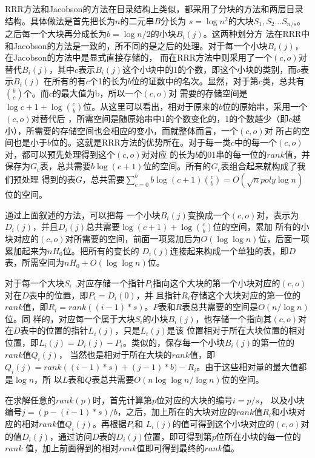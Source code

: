 RRR方法和Jacobson的方法在目录结构上类似，都采用了分块的方法和两层目录结构。具体做法是首先把长为$n$的二元串$B$分长为
$s = \log n^2$的大块$S_1, S_2\ldots S_{n/s}$。之后每一个大块再分成长为$b = \log {n/2}$的小块$B_i(j)$。这两种划分方
法在RRR中和Jacobson的方法是一致的，所不同的是之后的处理。对于每一个小块$B_i(j)$，在Jacobson的方法中是显式直接存储的，
而在RRR方法中则采用了一个$(c, o)$对替代$B_i(j)$，其中$c$表示$B_i(j)$这个小块中的1的个数，即这个小块的类别，而$o$表示$B_i(j)$
在所有的有$c$个1的长为$b$位的证数中的名次。显然，对于第$c$类，总共有$\binom{b}{c}$个。而$c$的最大值为b，所以一个$(c, o)$对
需要的存储空间是$\log{c + 1} + \log{\binom{c}{b}}$位。从这里可以看出，相对于原来的$b$位的原始串，采用一个$(c, o)$对替代后
，所需空间是随原始串中1的个数变化的，1的个数越少（即$c$越小），所需要的存储空间也会相应的变小，而就整体而言，一个$(c, o)$对
所占的空间也是小于$b$位的。这就是RRR方法的优势所在。对于每一类$c$中的每一个$(c, o)$对，都可以预先处理得到这个$(c, o)$对对应
的长为$b$的01串的每一位的$rank$值，并保存为$G_c$表，总共需要$b\log(c + 1)$位的空间。所有的$G_c$表组合起来就构成了我们预处理
得到的表$G$，总共需要$\sum_{c=0}^b {b\log (c+1)\binom{c}{b}=O(\sqrt{n}poly \log n)}$位的空间。

通过上面叙述的方法，可以把每
一个小块$B_i(j)$变换成一个$(c, o)$对，表示为$D_i(j)$，并且$D_i(j)$总共需要$\log(c + 1) + \log\binom{c}{b}$位的空间，累加
所有的小块对应的$(c, o)$对所需要的空间，前面一项累加后为$O(\log\log n)$位，后面一项累加起来为$nH_0$位。把所有的变长的
$D_i(j)$连接起来构成一个单独的表，即$D$表，所需空间为$nH_0 + O(\log\log n)$位。

对于每一个大块$S_i$ ,对应存储一个指针$P_i$指向这个大块的第一个小块对应的$(c, o)$对在$D$表中的位置，即$P_i = D_i(0)$，并
且指针$R_i$存储这个大块对应的第一位的$rank$值，即$R_i = rank((i-1)*s)$。$P$表和$R$表总共需要的空间是$O(n/\log n)$位。同
样的，对应每一个属于大块$S_i$的小块$B_i(j)$，也存储一个指向其$(c, o)$对在$D$表中的位置的指针$L_i(j)$，只是$L_i(j)$是该
位置相对于所在大块位置的相对位置，即$L_i(j) = D_i(j)-P_i$。类似的，保存每一个小块$B_i(j)$的第一位的$rank$值$Q_i(j)$，
当然也是相对于所在大块的$rank$值，即$Q_i(j) = rank((i-1)*s) + (j-1)*b) - R_i$。由于这些相对量的最大值都是$\log n$，所
以$L$表和$Q$表总共需要$O(n \log\log n/\log n)$位的空间。

在求解任意的$rank(p)$时，首先计算第$p$位对应的大块的编号$i = p/s$，
以及小块编号$j = (p -(i -1)*s)/b$，之后，加上所在的大块对应的$rank$值$R_i$和小块对应的相对$rank$值$Q_i(j)$。再根据$P_i$和
$L_i(j)$的值可得到这个小块对应的$(c, o)$对的值$D_i(j)$，通过访问$D$表的$D_i(j)$位置，即可得到第$p$位所在小块的每一位的$rank$
值，加上前面得到的相对$rank$值即可得到最终的$rank$值。

